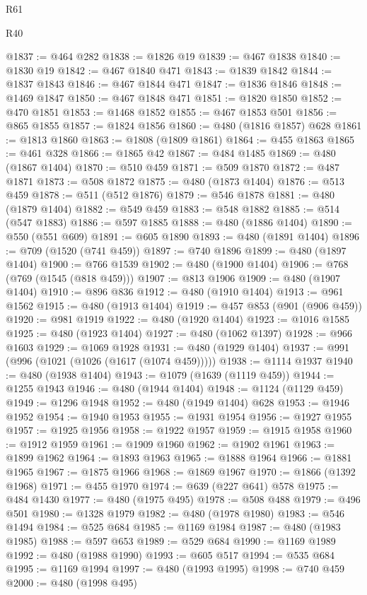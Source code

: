 \begin{lexlean}{R61}
\begin{lexlean}{R40}
\begin{coremodule}
{{{{{{{{{{{{{{{{{{{{{{{{{{{{{{{{{{{{{{{{{{{{{{{{{{{{{{{{{{{{{{{{{{{{{{{{{{{{{{{{{{{{{{{{{{{{{{{{{{{{{{{{{{{{{@1837 := @464 @282
@1838 := @1826 @19
@1839 := @467 @1838
@1840 := @1830 @19
@1842 := @467 @1840 @471
@1843 := @1839 @1842
@1844 := @1837 @1843
@1846 := @467 @1844 @471
@1847 := @1836 @1846
@1848 := @1469 @1847
@1850 := @467 @1848 @471
@1851 := @1820 @1850
@1852 := @470 @1851
@1853 := @1468 @1852
@1855 := @467 @1853 @501
@1856 := @865 @1855
@1857 := @1824 @1856
@1860 := @480 (@1816 @1857) @628
@1861 := @1813 @1860
@1863 := @1808 (@1809 @1861)
@1864 := @455 @1863
@1865 := @461 @328
@1866 := @1865 @42
@1867 := @484 @1485
@1869 := @480 (@1867 @1404)
@1870 := @510 @459
@1871 := @509 @1870
@1872 := @487 @1871
@1873 := @508 @1872
@1875 := @480 (@1873 @1404)
@1876 := @513 @459
@1878 := @511 (@512 @1876)
@1879 := @546 @1878
@1881 := @480 (@1879 @1404)
@1882 := @549 @459
@1883 := @548 @1882
@1885 := @514 (@547 @1883)
@1886 := @597 @1885
@1888 := @480 (@1886 @1404)
@1890 := @550 (@551 @609)
@1891 := @605 @1890
@1893 := @480 (@1891 @1404)
@1896 := @709 (@1520 (@741 @459))
@1897 := @740 @1896
@1899 := @480 (@1897 @1404)
@1900 := @766 @1539
@1902 := @480 (@1900 @1404)
@1906 := @768 (@769 (@1545 (@818 @459)))
@1907 := @813 @1906
@1909 := @480 (@1907 @1404)
@1910 := @896 @836
@1912 := @480 (@1910 @1404)
@1913 := @961 @1562
@1915 := @480 (@1913 @1404)
@1919 := @457 @853 (@901 (@906 @459))
@1920 := @981 @1919
@1922 := @480 (@1920 @1404)
@1923 := @1016 @1585
@1925 := @480 (@1923 @1404)
@1927 := @480 (@1062 @1397)
@1928 := @966 @1603
@1929 := @1069 @1928
@1931 := @480 (@1929 @1404)
@1937 := @991 (@996 (@1021 (@1026 (@1617 (@1074 @459)))))
@1938 := @1114 @1937
@1940 := @480 (@1938 @1404)
@1943 := @1079 (@1639 (@1119 @459))
@1944 := @1255 @1943
@1946 := @480 (@1944 @1404)
@1948 := @1124 (@1129 @459)
@1949 := @1296 @1948
@1952 := @480 (@1949 @1404) @628
@1953 := @1946 @1952
@1954 := @1940 @1953
@1955 := @1931 @1954
@1956 := @1927 @1955
@1957 := @1925 @1956
@1958 := @1922 @1957
@1959 := @1915 @1958
@1960 := @1912 @1959
@1961 := @1909 @1960
@1962 := @1902 @1961
@1963 := @1899 @1962
@1964 := @1893 @1963
@1965 := @1888 @1964
@1966 := @1881 @1965
@1967 := @1875 @1966
@1968 := @1869 @1967
@1970 := @1866 (@1392 @1968)
@1971 := @455 @1970
@1974 := @639 (@227 @641) @578
@1975 := @484 @1430
@1977 := @480 (@1975 @495)
@1978 := @508 @488
@1979 := @496 @501
@1980 := @1328 @1979
@1982 := @480 (@1978 @1980)
@1983 := @546 @1494
@1984 := @525 @684
@1985 := @1169 @1984
@1987 := @480 (@1983 @1985)
@1988 := @597 @653
@1989 := @529 @684
@1990 := @1169 @1989
@1992 := @480 (@1988 @1990)
@1993 := @605 @517
@1994 := @535 @684
@1995 := @1169 @1994
@1997 := @480 (@1993 @1995)
@1998 := @740 @459
@2000 := @480 (@1998 @495)
}}}}}}}}}}}}}}}}}}}}}}}}}}}}}}}}}}}}}}}}}}}}}}}}}}}}}}}}}}}}}}}}}}}}}}}}}}}}}}}}}}}}}}}}}}}}}}}}}}}}}}}}}}}}}
\end{coremodule}
\end{lexlean}
\end{lexlean}
